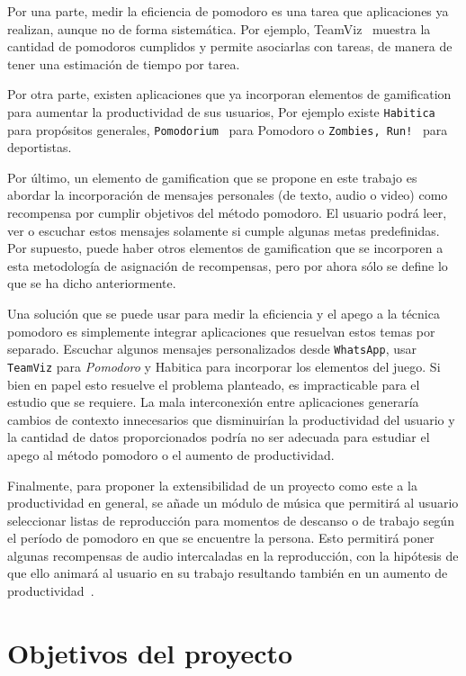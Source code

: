 \documentclass[12pt,letterpaper]{report}
\begin{document}
Por una parte, medir la eficiencia de pomodoro es una tarea que aplicaciones ya realizan, aunque no de forma
sistemática. Por ejemplo, TeamViz~\cite{teamviz} muestra la cantidad de pomodoros cumplidos y permite asociarlas con
tareas, de manera de tener una estimación de tiempo por tarea.

Por otra parte, existen aplicaciones que ya incorporan elementos de gamification para aumentar la productividad de sus
usuarios, Por ejemplo existe \texttt{Habitica}~\cite{habitica} para propósitos generales,
\texttt{Pomodorium}~\cite{pomodorium} para Pomodoro o \texttt{Zombies, Run!}~\cite{zombiesrun} para deportistas.

Por último, un elemento de gamification que se propone en este trabajo es abordar la incorporación de mensajes
personales (de texto, audio o video) como recompensa por cumplir objetivos del método pomodoro. El usuario podrá leer,
ver o escuchar estos mensajes solamente si cumple algunas metas predefinidas. Por supuesto, puede haber otros elementos
de gamification que se incorporen a esta metodología de asignación de recompensas, pero por ahora sólo se define lo que
se ha dicho anteriormente.

Una solución que se puede usar para medir la eficiencia y el apego a la técnica pomodoro es simplemente integrar
aplicaciones que resuelvan estos temas por separado. Escuchar algunos mensajes personalizados desde \texttt{WhatsApp},
usar \texttt{TeamViz} para \emph{Pomodoro} y Habitica para incorporar los elementos del juego. Si bien en papel esto
resuelve el problema planteado, es impracticable para el estudio que se requiere. La mala interconexión entre
aplicaciones generaría cambios de contexto innecesarios que disminuirían la productividad del usuario y la cantidad de
datos proporcionados podría no ser adecuada para estudiar el apego al método pomodoro o el aumento de productividad.

Finalmente, para proponer la extensibilidad de un proyecto como este a la productividad en general, se añade un módulo
de música que permitirá al usuario seleccionar listas de reproducción para momentos de descanso o de trabajo según el
período de pomodoro en que se encuentre la persona. Esto permitirá poner algunas recompensas de audio intercaladas en la
reproducción, con la hipótesis de que ello animará al usuario en su trabajo resultando también en un aumento de
productividad~\cite{hallam2002effects}.

\newpage
\section{Objetivos del proyecto}\label{objetivos-del-proyecto}
\end{document}
